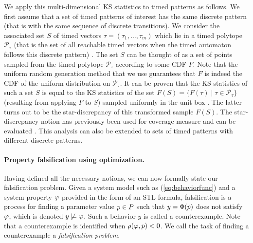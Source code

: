 We apply this multi-dimensional KS statistics to timed patterns as follows. We first assume that a set of timed patterns of interest has the same discrete pattern (that is with the same sequence of discrete transitions). We consider the associated set $S$ of timed vectors $\tau = (\tau_1, \ldots, \tau_m)$ which lie in a timed polytope $\mathcal{P}_{\tau}$ (that is the set of all reachable timed vectors when the timed automaton follows this discrete pattern) \cite{BBBK16}. The set $S$ can be thought of as a set of points sampled from the timed polytope $\mathcal{P}_{\tau}$ according to some CDF $F$. Note that the uniform random generation method  \cite{BBBK16}  that we use guarantees that $F$ is indeed the CDF of the uniform distribution on $\mathcal{P}_{\tau}$. It can be proven that the KS statistics of such a set $S$ is equal to the KS statistics of the set $F(S)=\{F(\tau)\mid  \tau \in \mathcal{P}_{\tau}\}$ (resulting from applying $F$ to $S$) sampled uniformly in the unit box \cite{rosenblatt1952}. The latter turns out to be the star-discrepancy of this transformed sample $F(S)$. The star-discrepancy notion has previously been used for coverage measure and can be evaluated \cite{DangN09}. This analysis can also be extended to sets of timed patterns with different discrete patterns.





\paragraph{Property falsification using optimization.}	

Having defined all the necessary notions, we can now formally state our falsification problem.
Given a system model such as (\ref{eq:behaviorfunc}) and a system property $\varphi$ provided in the form of an STL formula, 
falsification is a process for finding a parameter value $p \in P$
such that $y=\Phi(p)$ does not satisfy $\varphi$, which is denoted $y
\not\models \varphi$. Such a behavior $y$ is called a counterexample. 
Note that a counterexample is identified when 
$\rho(\varphi,p)<0$. We call the task of finding a counterexample 
a {\em falsification problem}. 

